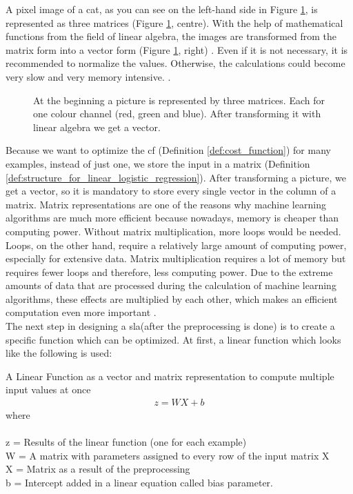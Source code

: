 A pixel image of a cat, as you can see on the left-hand side in Figure \ref{fig:07_image_vector_representation.png}, is represented as three matrices (Figure \ref{fig:07_image_vector_representation.png}, centre). With the help of mathematical functions from the field of linear algebra, the images are transformed from the matrix form into a vector form (Figure \ref{fig:07_image_vector_representation.png}, right) \cite[p. 276]{brownlee2019deep}. Even if it is not necessary, it is recommended to normalize the values. Otherwise, the calculations could become very slow and very memory intensive. \cite[p. 57]{Goodfellow-et-al-2016}.

\begin{figure}[htp]
	\caption{At the beginning a picture is represented by three matrices. Each for one colour channel (red, green and blue). After transforming it with linear algebra we get a vector.}
	\label{fig:07_image_vector_representation.png}
\end{figure}

Because we want to optimize the \gls{cf} (Definition \ref{def:cost_function}) for many examples, instead of just one, we store the input in a matrix (Definition \ref{def:structure_for_linear_logistic_regression}). After transforming a picture, we get a vector, so it is mandatory to store every single vector in the column of a matrix. Matrix representations are one of the reasons why machine learning algorithms are much more efficient because nowadays, memory is cheaper than computing power. Without matrix multiplication, more loops would be needed. Loops, on the other hand, require a relatively large amount of computing power, especially for extensive data. Matrix multiplication requires a lot of memory but requires fewer loops and therefore, less computing power. Due to the extreme amounts of data that are processed during the calculation of machine learning algorithms, these effects are multiplied by each other, which makes an efficient computation even more important \cite{AndrewNG}.\\

The next step in designing a \Gls{sla}(after the preprocessing is done) is to create a specific function which can be optimized. At first, a linear function which looks like the following is used:

\begin{definition}[label=lf]{A Linear Function as a vector and matrix representation to compute multiple input values at once}
	\begin{align*}
	z = W X + b
	\end{align*}
	where \\\\
	z = Results of the linear function (one for each example)\\
	W = A matrix with parameters assigned to every row of the input matrix X\\
	X = Matrix as a result of the preprocessing \\
	b = Intercept added in a linear equation called \Gls{bias} parameter.\\
\end{definition}

